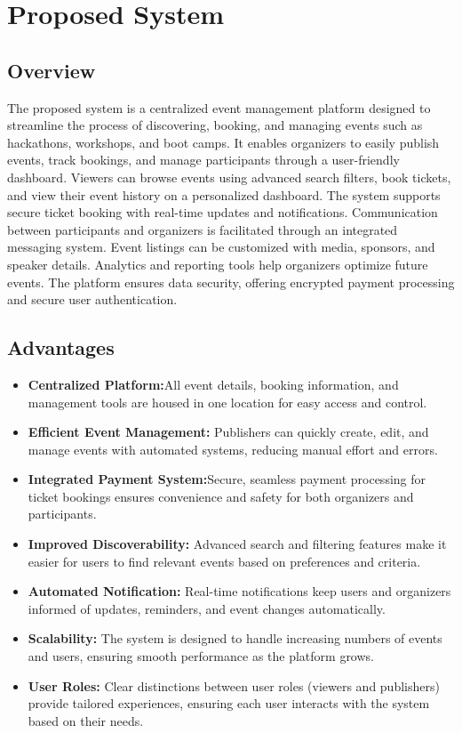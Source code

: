\documentclass[twoside,a4paper,openright]{report} %
\begin{document}
\newpage

\section{Proposed System}
\hspace{1.5cm}
\subsection{Overview}
The proposed system is a centralized event management platform designed to streamline the process of discovering, booking, and managing events such as hackathons, workshops, and boot camps. It enables organizers to easily publish events, track bookings, and manage participants through a user-friendly dashboard. Viewers can browse events using advanced search filters, book tickets, and view their event history on a personalized dashboard. The system supports secure ticket booking with real-time updates and notifications. Communication between participants and organizers is facilitated through an integrated messaging system. Event listings can be customized with media, sponsors, and speaker details. Analytics and reporting tools help organizers optimize future events. The platform ensures data security, offering encrypted payment processing and secure user authentication.

\subsection{Advantages}
\hspace{1.5cm}
\begin{itemize}
	\item \textbf{Centralized Platform:}All event details, booking information, and management tools are housed in one location for easy access and control.
	\item \textbf{Efficient Event Management: } Publishers can quickly create, edit, and manage events with automated systems, reducing manual effort and errors.
	\item \textbf{Integrated Payment System:}Secure, seamless payment processing for ticket bookings ensures convenience and safety for both organizers and participants.
	\item \textbf{Improved Discoverability: } Advanced search and filtering features make it easier for users to find relevant events based on preferences and criteria.
	\item \textbf{Automated Notification:}  Real-time notifications keep users and organizers informed of updates, reminders, and event changes automatically.
	\item \textbf{Scalability: } The system is designed to handle increasing numbers of events and users, ensuring smooth performance as the platform grows.
	\item \textbf{User Roles: }  Clear distinctions between user roles (viewers and publishers) provide tailored experiences, ensuring each user interacts with the system based on their needs.
\end{itemize}
\end{document}
